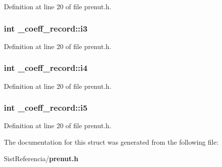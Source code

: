 \-Definition at line 20 of file prenut.\-h.

\subsubsection[{i3}]{\setlength{\rightskip}{0pt plus 5cm}int {\bf \-\_\-coeff\-\_\-record\-::i3}}\label{struct__coeff__record_a5e5dde6efe7dad52d6e9c452ed61fd10}


\-Definition at line 20 of file prenut.\-h.

\subsubsection[{i4}]{\setlength{\rightskip}{0pt plus 5cm}int {\bf \-\_\-coeff\-\_\-record\-::i4}}\label{struct__coeff__record_a57bf69872dcd48023df1e9888c1a22e0}


\-Definition at line 20 of file prenut.\-h.

\subsubsection[{i5}]{\setlength{\rightskip}{0pt plus 5cm}int {\bf \-\_\-coeff\-\_\-record\-::i5}}\label{struct__coeff__record_aa556a03360f2703866ce6f3c63d2b6c2}


\-Definition at line 20 of file prenut.\-h.



\-The documentation for this struct was generated from the following file\-:\begin{DoxyCompactItemize}
\item 
\-Sist\-Referencia/{\bf prenut.\-h}\end{DoxyCompactItemize}
